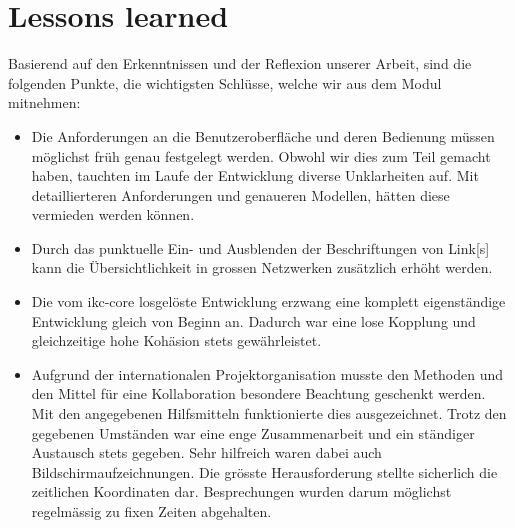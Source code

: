 \section{Lessons learned}
Basierend auf den Erkenntnissen und der Reflexion unserer Arbeit, sind die folgenden Punkte, die wichtigsten Schlüsse, welche wir aus dem Modul mitnehmen:
\begin{itemize}
    \item Die Anforderungen an die Benutzeroberfläche und deren Bedienung müssen möglichst früh genau festgelegt werden. Obwohl wir dies zum Teil gemacht haben, tauchten im Laufe der Entwicklung diverse Unklarheiten auf. Mit detaillierteren Anforderungen und genaueren Modellen, hätten diese vermieden werden können.
    \item Durch das punktuelle Ein- und Ausblenden der Beschriftungen von \gls{Link}[s] kann die Übersichtlichkeit in grossen Netzwerken zusätzlich erhöht werden. 
    \item Die vom \gls{ikc-core} losgelöste Entwicklung erzwang eine komplett eigenständige Entwicklung gleich von Beginn an. Dadurch war eine lose Kopplung und gleichzeitige hohe Kohäsion stets gewährleistet.
    \item Aufgrund der internationalen Projektorganisation musste den Methoden und den Mittel für eine Kollaboration besondere Beachtung geschenkt werden. Mit den angegebenen Hilfsmitteln funktionierte dies ausgezeichnet. Trotz den gegebenen Um\-ständ\-en war eine enge Zusammenarbeit und ein ständiger Austausch stets gegeben. Sehr hilfreich waren dabei auch Bildschirmaufzeichnungen. Die grösste Herausforderung stellte sicherlich die zeitlichen Koordinaten dar. Besprechungen wurden darum mög\-lich\-st regelmässig zu fixen Zeiten abgehalten.
    

\end{itemize}
